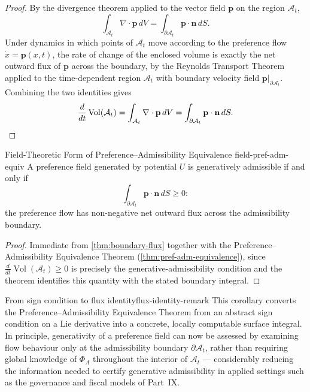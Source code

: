 \documentclass[12pt,twoside,openright]{book}
\newcommand{\Vol}{\operatorname{Vol}}
\begin{document}
\begin{proof}
  By the divergence theorem applied to the vector field
  $\mathbf{p}$ on the region $\mathcal{A}_t$,
  \[
    \int_{\mathcal{A}_t} \nabla\cdot\mathbf{p}\,dV
    = \int_{\partial\mathcal{A}_t} \mathbf{p}\cdot\mathbf{n}\,dS.
  \]
  Under dynamics in which points of $\mathcal{A}_t$ move
  according to the preference flow $\dot{x}=\mathbf{p}(x,t)$,
  the rate of change of the enclosed volume is exactly the
  net outward flux of $\mathbf{p}$ across the boundary, by
  the Reynolds Transport Theorem applied to the
  time-dependent region $\mathcal{A}_t$ with boundary
  velocity field $\mathbf{p}|_{\partial\mathcal{A}_t}$.
  Combining the two identities gives
  \[
    \frac{d}{dt}\Vol(\mathcal{A}_t)
    = \int_{\mathcal{A}_t} \nabla\cdot\mathbf{p}\,dV
    = \int_{\partial\mathcal{A}_t} \mathbf{p}\cdot\mathbf{n}\,dS. \qedhere
  \]
\end{proof}

\begin{corollary}{Field-Theoretic Form of Preference--Admissibility Equivalence}%
  {field-pref-adm-equiv}
  A preference field generated by potential $U$ is
  generatively admissible if and only if
  \[
    \int_{\partial\mathcal{A}_t} \mathbf{p}\cdot\mathbf{n}\,dS \ge 0:
  \]
  the preference flow has non-negative net outward flux
  across the admissibility boundary.
\end{corollary}

\begin{proof}
  Immediate from \cref{thm:boundary-flux} together with the
  Preference--Admissibility Equivalence Theorem
  (\cref{thm:pref-adm-equivalence}), since
  $\frac{d}{dt}\Vol(\mathcal{A}_t) \ge 0$ is precisely the
  generative-admissibility condition and the theorem
  identifies this quantity with the stated boundary
  integral.
\end{proof}

\begin{remark}{From sign condition to flux identity}{flux-identity-remark}
  This corollary converts the Preference--Admissibility
  Equivalence Theorem from an abstract sign condition on a
  Lie derivative into a concrete, locally computable
  surface integral. In principle, generativity of a
  preference field can now be assessed by examining flow
  behaviour only at the admissibility boundary
  $\partial\mathcal{A}_t$, rather than requiring global
  knowledge of $\Phi_A$ throughout the interior of
  $\mathcal{A}_t$ --- considerably reducing the information
  needed to certify generative admissibility in applied
  settings such as the governance and fiscal models of
  Part~IX.
\end{remark}
\end{document}
